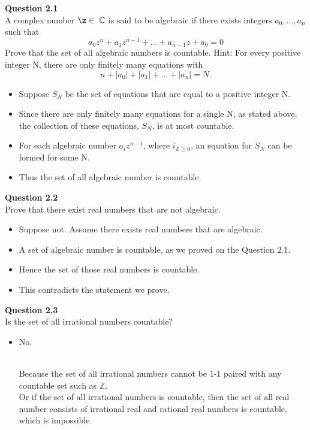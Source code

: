 \documentclass[12pt]{article}
\begin{document}
 


\noindent
\textbf{Question 2.1}\\
A complex number $\z \in \;\mathbb{C}$ is said to be algebraic if there exists integers $a_0,...,a_n$ such that $$a_0z^n + a_1z^{n-1} + ... + a_{n-1}z + a_0 = 0$$
Prove that the set of all algebraic numbers is countable. Hint: For every positive integer N,
there are only finitely many equations with
$$n + |a_0| + |a_1| + ... + |a_n| = N.$$
\begin{itemize}
    \item Suppose $S_N$ be the set of equations that are equal to a positive integer N.
    \item Since there are only finitely many equations for a single N, as stated above, the collection of these equations, $S_N$, is at most countable. 
    \item For each algebraic number $a_iz^{n-i}$, where $i_{\mathbb{Z}\ge 0}$, an equation for $S_N$ can be formed for some N.
    \item Thus the set of all algebraic number is countable.\\
\end{itemize}

\noindent
\textbf{Question 2.2}\\
Prove that there exist real numbers that are not algebraic.
\begin{itemize}
    \item Suppose not. Assume there exists real numbers that are algebraic.
    \item A set of algebraic number is countable, as we proved on the Question 2.1.
    \item Hence the set of those real numbers is countable.  
    \item This contradicts the statement we prove.\\
    \end{itemize}

\noindent
\textbf{Question 2.3}\\
Is the set of all irrational numbers countable?
\begin{itemize}
    \item No. 
    
    \\Because the set of all irrational numbers cannot be 1-1 paired with any countable set such as $\mathbb{Z}.$\\
    
    Or if the set of all irrational numbers is countable, then the set of all real number consists of irrational real and rational real numbers is countable, which is impossible.
\end{itemize}
\end{document}
